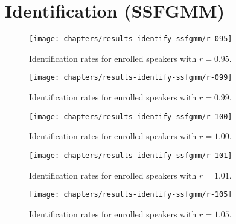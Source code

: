 \chapter{Identification (SSFGMM)}
\label{apx:results-identify-ssfgmm}



\begin{figure}[ht]
	\centering
	\texttt{[image: chapters/results-identify-ssfgmm/r-095]}
	\caption{Identification rates for enrolled speakers with $r = 0.95$.}
	\label{fig:r-095}
\end{figure}

\newpage


\begin{figure}[ht]
	\centering
	\texttt{[image: chapters/results-identify-ssfgmm/r-099]}
	\caption{Identification rates for enrolled speakers with $r = 0.99$.}
	\label{fig:r-099}
\end{figure}

\newpage


\begin{figure}[ht]
	\centering
	\texttt{[image: chapters/results-identify-ssfgmm/r-100]}
	\caption{Identification rates for enrolled speakers with $r = 1.00$.}
	\label{fig:r-100}
\end{figure}

\newpage


\begin{figure}[ht]
	\centering
	\texttt{[image: chapters/results-identify-ssfgmm/r-101]}
	\caption{Identification rates for enrolled speakers with $r = 1.01$.}
	\label{fig:r-101}
\end{figure}

\newpage


\begin{figure}[ht]
	\centering
	\texttt{[image: chapters/results-identify-ssfgmm/r-105]}
	\caption{Identification rates for enrolled speakers with $r = 1.05$.}
	\label{fig:r-105}
\end{figure}

